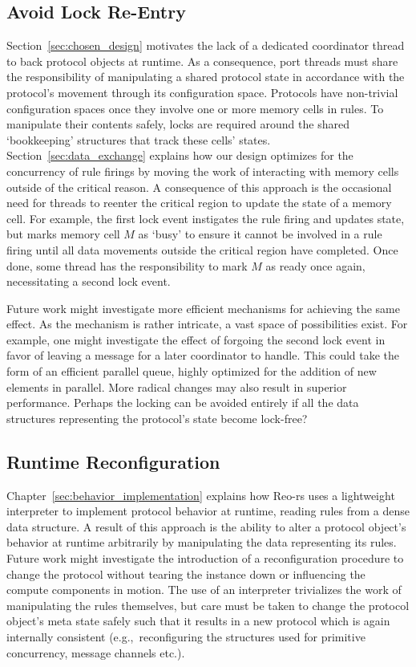 \subsection{Avoid Lock Re-Entry}
Section~\ref{sec:chosen_design} motivates the lack of a dedicated coordinator thread to back protocol objects at runtime. As a consequence, port threads must share the responsibility of manipulating a shared protocol state in accordance with the protocol's movement through its configuration space. Protocols have non-trivial configuration spaces once they involve one or more memory cells in rules. To manipulate their contents safely, locks are required around the shared `bookkeeping' structures that track these cells' states. Section~\ref{sec:data_exchange} explains how our design optimizes for the concurrency of rule firings by moving the work of interacting with memory cells outside of the critical reason. A consequence of this approach is the occasional need for threads to reenter the critical region to update the state of a memory cell. For example, the first lock event instigates the rule firing and updates state, but marks memory cell $M$ as `busy' to ensure it cannot be involved in a rule firing until all data movements outside the critical region have completed. Once done, some thread has the responsibility to mark $M$ as ready once again, necessitating a second lock event.

Future work might investigate more efficient mechanisms for achieving the same effect. As the mechanism is rather intricate, a vast space of possibilities exist. For example, one might investigate the effect of forgoing the second lock event in favor of leaving a message for a later coordinator to handle. This could take the form of an efficient parallel queue, highly optimized for the addition of new elements in parallel. More radical changes may also result in superior performance. Perhaps the locking can be avoided entirely if all the data structures representing the protocol's state become lock-free?

\subsection{Runtime Reconfiguration}
\label{sec:future_runtime_reconfig}
Chapter~\ref{sec:behavior_implementation} explains how Reo-rs uses a lightweight interpreter to implement protocol behavior at runtime, reading rules from a dense data structure. A result of this approach is the ability to alter a protocol object's behavior at runtime arbitrarily by manipulating the data representing its rules. Future work might investigate the introduction of a reconfiguration procedure to change the protocol without tearing the instance down or influencing the compute components in motion. The use of an interpreter trivializes the work of manipulating the rules themselves, but care must be taken to change the protocol object's meta state safely such that it results in a new protocol which is again internally consistent (e.g.,\ reconfiguring the structures used for primitive concurrency, message channels etc.).

